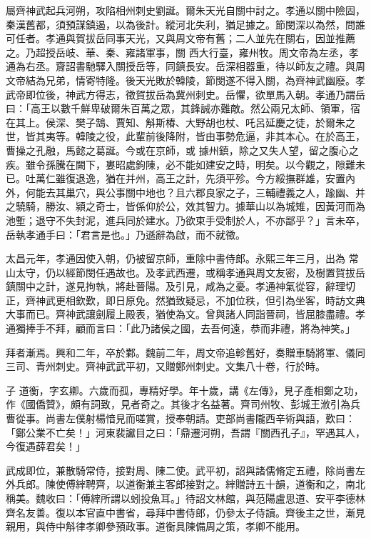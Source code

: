 \begin{pinyinscope}
 屬齊神武起兵河朔，攻陷相州刺史劉誕。爾朱天光自關中討之。孝通以關中險固，秦漢舊都，須預謀鎮遏，以為後計。縱河北失利，猶足據之。節閔深以為然，問誰可任者。孝通與賀拔岳同事天光，又與周文帝有舊；二人並先在關右，因並推薦之。乃超授岳岐、華、秦、雍諸軍事，關
 西大行臺，雍州牧。周文帝為左丞，孝通為右丞。齎詔書馳驛入關授岳等，同鎮長安。岳深相器重，待以師友之禮。與周文帝結為兄弟，情寄特隆。後天光敗於韓陵，節閔遂不得入關，為齊神武幽廢。孝武帝即位後，神武方得志，徵賀拔岳為冀州刺史。岳懼，欲單馬入朝。孝通乃謂岳曰：「高王以數千鮮卑破爾朱百萬之眾，其鋒誠亦難敵。然公兩兄太師、領軍，宿在其上。侯深、樊子鵠、賈知、斛斯椿、大野胡也杖、吒呂延慶之徒，於爾朱之世，皆其夷等。韓陵之役，此輩前後降附，皆由事勢危逼，非其本心。在於高王，曹操之孔融，馬懿之葛誕。今或在京師，或
 據州鎮，除之又失人望，留之腹心之疾。雖令孫騰在闕下，婁昭處鉤陳，必不能如建安之時，明矣。以今觀之，隙難未已。吐萬仁雖復退逸，猶在并州，高王之計，先須平殄。今方綏撫群雄，安置內外，何能去其巢穴，與公事關中地也？且六郡良家之子，三輔禮義之人，踰幽、并之驍騎，勝汝、潁之奇士，皆係仰於公，效其智力。據華山以為城雉，因黃河而為池塹；退守不失封泥，進兵同於建水。乃欲束手受制於人，不亦鄙乎？」言未卒，岳執孝通手曰：「君言是也。」乃遜辭為啟，而不就徵。



 太昌元年，孝通因使入朝，仍被留京師，重除中書侍郎。永熙三年三月，出為
 常山太守，仍以經節閔任遇故也。及孝武西遷，或稱孝通與周文友密，及樹置賀拔岳鎮關中之計，遂見拘執，將赴晉陽。及引見，咸為之憂。孝通神氣從容，辭理切正，齊神武更相欽歎，即日原免。然猶致疑忌，不加位秩，但引為坐客，時訪文典大事而已。齊神武讓劍履上殿表，猶使為文。曾與諸人同詣晉祠，皆屈膝盡禮。孝通獨捧手不拜，顧而言曰：「此乃諸侯之國，去吾何遠，恭而非禮，將為神笑。」



 拜者漸焉。興和二年，卒於鄴。魏前二年，周文帝追軫舊好，奏贈車騎將軍、儀同三司、青州刺史。齊神武武平初，又贈鄭州刺史。文集八十卷，行於時。



 子
 道衡，字玄卿。六歲而孤，專精好學。年十歲，講《左傳》，見子產相鄭之功，作《國僑贊》，頗有詞致，見者奇之。其後才名益著。齊司州牧、彭城王浟引為兵曹從事。尚書左僕射楊愔見而嗟賞，授奉朝請。吏部尚書隴西辛術與語，歎曰：「鄭公業不亡矣！」河東裴讞目之曰：「鼎遷河朔，吾謂『關西孔子』，罕遇其人，今復遇薛君矣！」



 武成即位，兼散騎常侍，接對周、陳二使。武平初，詔與諸儒脩定五禮，除尚書左外兵郎。陳使傅縡聘齊，以道衡兼主客郎接對之。縡贈詩五十韻，道衡和之，南北稱美。魏收曰：「傅縡所謂以蚓投魚耳。」待詔文林館，與范陽盧思道、安平李德林
 齊名友善。復以本官直中書省，尋拜中書侍郎，仍參太子侍讀。齊後主之世，漸見親用，與侍中斛律孝卿參預政事。道衡具陳備周之策，孝卿不能用。




\end{pinyinscope}
